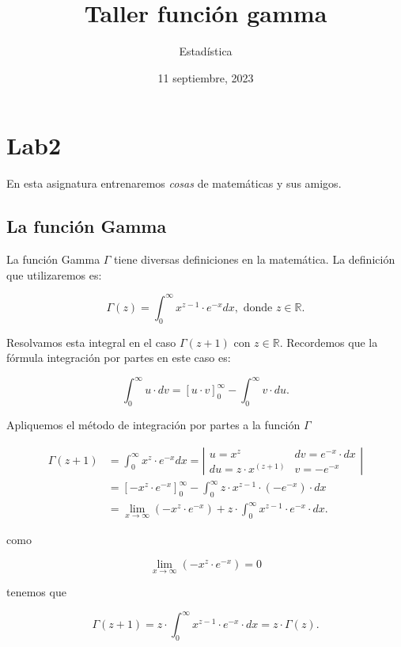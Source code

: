\documentclass[
]{article}
\title{Taller función gamma}
\author{Estadística}
\date{11 septiembre, 2023}
\begin{document}
\maketitle

{
\hypersetup{linkcolor=blue}
\setcounter{tocdepth}{2}
\tableofcontents
}
\hypertarget{lab2}{%
\section{Lab2}\label{lab2}}

En esta asignatura entrenaremos \emph{cosas} de matemáticas y sus
amigos.

\hypertarget{la-funciuxf3n-gamma}{%
\subsection{La función Gamma}\label{la-funciuxf3n-gamma}}

La función Gamma \(\Gamma\) tiene diversas definiciones en la
matemática. La definición que utilizaremos es:

\[ \Gamma(z)= \int_0^{\infty} x^{z-1} \cdot e^{-x}  dx, \mbox{ donde } z\in \mathbb{R}.\]

Resolvamos esta integral en el caso \(\Gamma(z+1)\) con
\(z\in \mathbb{R}\). Recordemos que la fórmula integración por partes en
este caso es:

\[\int_{0}^{\infty} u \cdot d v =\left[u\cdot v \right]_0^\infty-\int_0^{\infty} v \cdot du.\]

Apliquemos el método de integración por partes a la función \(\Gamma\)

\[
\begin{aligned}
\Gamma(z+1) &=  \int_0^{\infty} x^{z} \cdot e^{-x}dx= 
\left|
\begin{matrix} u=x^{z}  & dv= e^{-x}\cdot  dx 
\\ du= z \cdot x^(z+1)  & v=-e^{-x} 
\end{matrix}
\right|
\\
&=\left[-x^z\cdot e^{-x}\right]_0^\infty
-\int_0^{\infty} z\cdot x^{z-1} \cdot \left(-e^{-x}\right)\cdot  dx
\\
&=
\lim_{x\to\infty}\left(-x^z\cdot e^{-x}\right)
+
z\cdot \int_0^{\infty} x^{z-1} \cdot e^{-x}\cdot dx.
\end{aligned}
\]

como

\[\lim_{x\to\infty}\left(-x^z\cdot e^{-x}\right)=0\]

tenemos que

\[\Gamma(z+1)= 
z\cdot \int_0^{\infty} x^{z-1} \cdot e^{-x}\cdot  dx=z\cdot \Gamma(z).
\]
\end{document}
